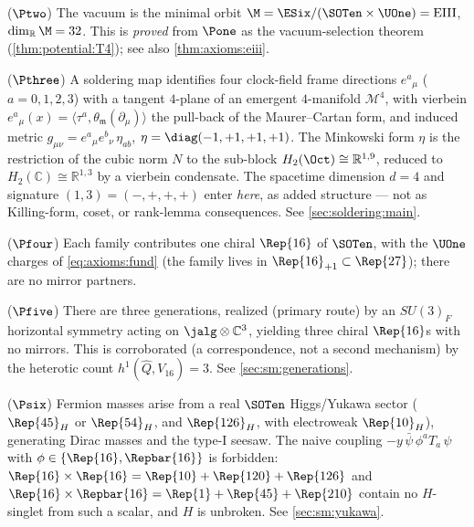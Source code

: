 \begin{postulate}\label{post:axioms:P2}
($\Ptwo$) The vacuum is the minimal orbit
$\M=\ESix/(\SOTen\times\UOne)=\mathrm{EIII}$, $\dim_{\mathbb R}\M=32$. This is
\emph{proved} from $\Pone$ as the vacuum-selection theorem
(\autoref{thm:potential:T4}); see also \autoref{thm:axioms:eiii}.
\end{postulate}

\begin{postulate}\label{post:axioms:P3}
($\Pthree$) A soldering map identifies four clock-field frame directions
$e^{a}{}_{\mu}$ ($a=0,1,2,3$) with a tangent $4$-plane of an emergent
$4$-manifold $\mathcal M^4$, with vierbein
$e^{a}{}_{\mu}(x)=\langle\tau^a,\theta_{\mathfrak m}(\partial_\mu)\rangle$
the pull-back of the Maurer--Cartan form, and induced metric
$g_{\mu\nu}=e^{a}{}_{\mu}e^{b}{}_{\nu}\,\eta_{ab}$,
$\eta=\diag(-1,+1,+1,+1)$. The Minkowski form $\eta$ is the restriction of
the cubic norm $N$ to the sub-block $H_2(\Oct)\cong\mathbb R^{1,9}$, reduced
to $H_2(\mathbb C)\cong\mathbb R^{1,3}$ by a vierbein condensate. The
spacetime dimension $d=4$ and signature $(1,3)=(-,+,+,+)$ enter \emph{here},
as added structure --- not as Killing-form, coset, or rank-lemma
consequences. See \autoref{sec:soldering:main}.
\end{postulate}

\begin{postulate}\label{post:axioms:P4}
($\Pfour$) Each family contributes one chiral $\Rep{16}$ of $\SOTen$, with
the $\UOne$ charges of \eqref{eq:axioms:fund} (the family lives in
$\Rep{16}_{+1}\subset\Rep{27}$); there are no mirror partners.
\end{postulate}

\begin{postulate}\label{post:axioms:P5}
($\Pfive$) There are three generations, realized (primary route) by an
$SU(3)_F$ horizontal symmetry acting on $\jalg\otimes\mathbb C^3$,
yielding three chiral $\Rep{16}$s with no mirrors. This is corroborated
(a correspondence, not a second mechanism) by the heterotic count
$h^1(\widehat Q,V_{16})=3$. See \autoref{sec:sm:generations}.
\end{postulate}

\begin{postulate}\label{post:axioms:P6}
($\Psix$) Fermion masses arise from a real $\SOTen$ Higgs/Yukawa sector
($\Rep{45}_H$ or $\Rep{54}_H$, and $\Rep{126}_H$, with electroweak
$\Rep{10}_H$), generating Dirac masses and the type-I seesaw. The naive
coupling $-y\,\bar\psi\,\phi^a T_a\,\psi$ with $\phi\in\{\Rep{16},\Repbar{16}\}$
is forbidden: $\Rep{16}\times\Rep{16}=\Rep{10}+\Rep{120}+\Rep{126}$ and
$\Rep{16}\times\Repbar{16}=\Rep{1}+\Rep{45}+\Rep{210}$ contain no $H$-singlet
from such a scalar, and $H$ is unbroken. See \autoref{sec:sm:yukawa}.
\end{postulate}

